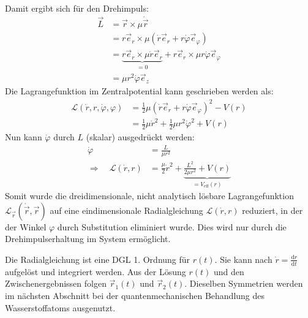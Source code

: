 \documentclass[9pt]{report}
\begin{document}
Damit ergibt sich für den Drehimpuls:
\begin{align}
\vec{L}&=\vec{r}\times \mu\dot{\vec{r}}\\
&=r\vec{e}_r\times \mu(\dot{r}\vec{e}_r+r\dot{\varphi}\vec{e}_{\varphi})\\
&=\underbrace{r\vec{e}_r\times \mu\dot{r}\vec{e}_r }_{=0}+r\vec{e}_r\times \mu r\dot{\varphi}\vec{e}_{\varphi}\\
&=\mu r^2\dot{\varphi}\vec{e}_z
\end{align}
Die Lagrangefunktion im Zentralpotential kann geschrieben werden als:
\begin{align}
\mathcal{L}(\dot{r},r,\dot{\varphi},\varphi)&=\frac{1}{2}\mu(\dot{r}\vec{e}_r+r\dot{\varphi}\vec{e}_{\varphi})^2-V(r)\\
&=\frac{1}{2}\mu\dot{r}^2+\frac{1}{2}\mu r^2\dot{\varphi}^2+V(r)
\end{align}
Nun kann $\dot{\varphi}$ durch $L$ (skalar) ausgedrückt werden:
\begin{align}
\dot{\varphi}&=\frac{L}{\mu r^2}\\
\Rightarrow\quad\mathcal{L}(\dot{r},r)&=\frac{\mu}{2}\dot{r}^2+\underbrace{\frac{L^2}{2\mu r^2}+V(r)}_{=V_{\mathrm{eff}}(r)}
\end{align}
Somit wurde die dreidimensionale, nicht analytisch lösbare Lagrangefunktion $\mathcal{L}_{\vec{r}}(\dot{\vec{r}},\vec{r})$ auf eine eindimensionale Radialgleichung $\mathcal{L}(\dot{r},r)$ reduziert, in der der Winkel $\varphi$ durch Substitution eliminiert wurde. Dies wird nur durch die Drehimpulserhaltung im System ermöglicht.

Die Radialgleichung ist eine DGL 1. Ordnung für $r(t)$. Sie kann nach $\dot{r}=\frac{\mathrm{d}r}{\mathrm{d}t}$ aufgelöst und integriert werden. Aus der Lösung $r(t)$ und den Zwischenergebnissen folgen $\vec{r}_1(t)$ und $\vec{r}_2(t)$. Dieselben Symmetrien werden im nächsten Abschnitt bei der quantenmechanischen Behandlung des Wasserstoffatoms ausgenutzt.
\end{document}
